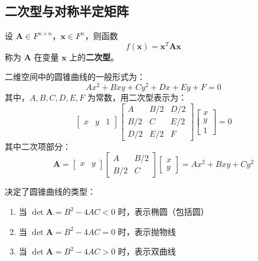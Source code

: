 \subsection{二次型与对称半定矩阵}

\begin{definition}
    设 $\mathbf{A} \in F^{n \times n}$，$\mathbf{x} \in F^n$，则函数
    \[
        f(\mathbf{x}) = \mathbf{x}^T \mathbf{A} \mathbf{x}
    \]
    称为 $\mathbf{A}$ 在变量 $\mathbf{x}$ 上的\textbf{二次型}。
    \label{def:quadratic_form}
\end{definition}
\vspace{1em}

\begin{example}[二次型与圆锥曲线]
    二维空间中的圆锥曲线的一般形式为：
    \begin{equation}
        Ax^2 + Bxy + Cy^2 + Dx + Ey + F = 0
        \label{eq:conic_section_general_form}
    \end{equation}
    其中，$A,B,C,D,E,F$ 为常数，用二次型表示为：
    \begin{equation}
        \begin{bmatrix}
            x & y & 1
        \end{bmatrix}
        \begin{bmatrix}
            A & B/2 & D/2 \\
            B/2 & C & E/2 \\
            D/2 & E/2 & F
        \end{bmatrix}
        \begin{bmatrix}
            x \\ y \\ 1
        \end{bmatrix} = 0
        \label{eq:conic_section_quadratic_form}
    \end{equation}
    其中二次项部分：
    \begin{equation}
        \mathbf{A}=\begin{bmatrix}
            x & y
        \end{bmatrix}
        \begin{bmatrix}
            A & B/2 \\
            B/2 & C
        \end{bmatrix}
        \begin{bmatrix}
            x \\ y
        \end{bmatrix} = Ax^2 + Bxy + Cy^2
        \label{eq:conic_section_quadratic_form_quadratic_part}
    \end{equation}

    决定了圆锥曲线的类型：
    \begin{enumerate}
        \item 当 $\det{\mathbf{A}} = B^2 - 4AC < 0$ 时，表示椭圆（包括圆）
        \item 当 $\det{\mathbf{A}} = B^2 - 4AC = 0$ 时，表示抛物线
        \item 当 $\det{\mathbf{A}} = B^2 - 4AC > 0$ 时，表示双曲线
    \end{enumerate}
    \label{ex:conic_section_quadratic_form}
\end{example}
